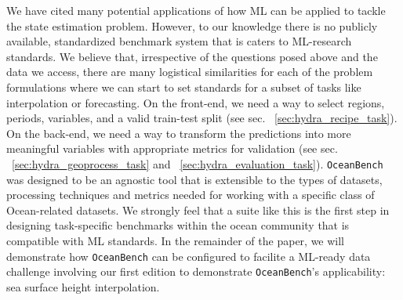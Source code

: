 We have cited many potential applications of how ML can be applied to tackle the state estimation problem. 
However, to our knowledge there is no publicly available, standardized benchmark system that is caters to ML-research standards.
We believe that, irrespective of the questions posed above and the data we access, there are many logistical similarities for each of the problem formulations where we can start to set standards for a subset of tasks like interpolation or forecasting. 
On the front-end, we need a way to select regions, periods, variables, and a valid train-test split (see sec. ~\ref{sec:hydra_recipe_task}). 
On the back-end, we need a way to transform the predictions into more meaningful variables with appropriate metrics for validation (see sec. ~\ref{sec:hydra_geoprocess_task} and ~\ref{sec:hydra_evaluation_task}).
\texttt{OceanBench} was designed to be an agnostic tool that is extensible to the types of datasets, processing techniques and metrics needed for working with a specific class of Ocean-related datasets. 
We strongly feel that a suite like this is the first step in designing task-specific benchmarks within the ocean community that is compatible with ML standards. 
In the remainder of the paper, we will demonstrate how \texttt{OceanBench} can be configured to facilite a ML-ready data challenge involving our first edition to demonstrate \texttt{OceanBench}'s applicability: sea surface height interpolation.
